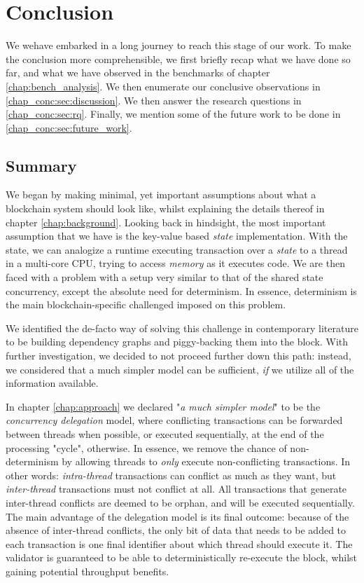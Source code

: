 \chapter{Conclusion} \label{chap:conclusion}

We wehave embarked in a long journey to reach this stage of our work. To make the conclusion more
comprehensible, we first briefly recap what we have done so far, and what we have observed in the
benchmarks of chapter \ref{chap:bench_analysis}. We then enumerate our conclusive observations in \ref{chap_conc:sec:discussion}. We then answer the research questions in \ref{chap_conc:sec:rq}. Finally, we mention some of the future work to be done in \ref{chap_conc:sec:future_work}.

\section{Summary}
We began by making minimal, yet important assumptions about what a blockchain system should look
like, whilst explaining the details thereof in chapter \ref{chap:background}. Looking back in
hindsight, the most important assumption that we have is the key-value based \textit{state}
implementation. With the state, we can analogize a runtime executing transaction over a
\textit{state} to a thread in a multi-core CPU, trying to access \textit{memory} as it executes
code. We are then faced with a problem with a setup very similar to that of the shared state
concurrency, except the absolute need for determinism. In essence, determinism is the main
blockchain-specific challenged imposed on this problem.

We identified the de-facto way of solving this challenge in contemporary literature to be building
dependency graphs and piggy-backing them into the block. With further investigation, we decided to
not proceed further down this path: instead, we considered that a much simpler model can be
sufficient, \textit{if} we utilize all of the information available.

In chapter \ref{chap:approach} we declared "\textit{a much simpler model}" to be the
\textit{concurrency delegation} model, where conflicting transactions can be forwarded between
threads when possible, or executed sequentially, at the end of the processing "cycle", otherwise. In
essence, we remove the chance of non-determinism by allowing threads to \textit{only} execute
non-conflicting transactions. In other words: \textit{intra-thread} transactions can conflict as
much as they want, but \textit{inter-thread} transactions must not conflict at all. All transactions
that generate inter-thread conflicts are deemed to be orphan, and will be executed sequentially. The
main advantage of the delegation model is its final outcome: because of the
absence of inter-thread conflicts, the only bit of data that needs to be added to each transaction
is one final identifier about which thread should execute it. The validator is guaranteed to be able
to deterministically re-execute the block, whilst gaining potential throughput benefits.

